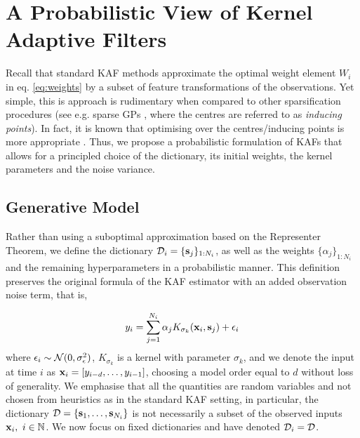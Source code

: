 
\section{A Probabilistic View of Kernel Adaptive Filters} %
\label{sec:a_novel_kernel_adaptive_filter}

Recall that standard KAF methods approximate the optimal weight element $W_i$ in eq. \eqref{eq:weights} by a subset of feature transformations of the observations. Yet simple, this is approach is rudimentary when compared to other sparsification procedures (see e.g. sparse GPs \cite{quinonero2005unifying}, where the centres are referred to as \emph{inducing points}). In fact, it is known that optimising over the centres/inducing points is more appropriate \cite{tobar_npk,zoubin_sparse}. Thus, we propose a probabilistic formulation of KAFs that allows for a principled choice of the dictionary, its initial weights, the kernel parameters and the noise variance.

\subsection{Generative Model}
Rather than using a suboptimal approximation based on the Representer Theorem, we define the dictionary $\mathcal{D}_i=\{\mathbf{s}_j\}_{1:N_i}$, as well as the weights $\{\alpha_j\}_{1:N_i}$ and the remaining  hyperparameters in a probabilistic manner. This definition preserves the original formula of the KAF estimator with an added observation noise term, that is, 

\begin{equation}
y_i = \sum_{j=1}^{N_i} \alpha_j K_{\sigma_k}(\mathbf{x}_i, \mathbf{s}_j) + \epsilon_i
\label{estimator}
\end{equation}
where $\epsilon_i\sim\mathcal{N}(0,\sigma_\epsilon^2)$, $K_{\sigma_k}$ is a kernel with parameter $\sigma_k$, and we denote the input at time $i$ as $\mathbf{x}_i = [y_{i-d},\ldots, y_{i-1}]$, choosing a model order equal to $d$ without loss of generality. We emphasise that all the quantities are random variables and not chosen from heuristics as in the standard KAF setting, in particular, the dictionary $\mathcal{D}=\{\mathbf{s}_1,\ldots,\mathbf{s}_{N_i}\}$ is not necessarily a subset of the observed inputs $\mathbf{x}_i,\ i\in\mathbb{N}$. We now focus on fixed dictionaries and have denoted $\mathcal{D}_i=\mathcal{D}$.

